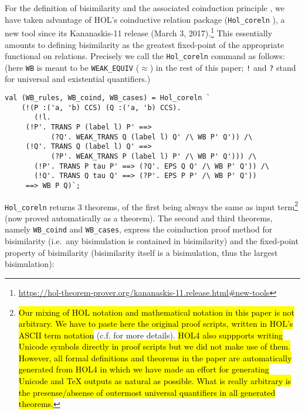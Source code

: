 For the definition of bisimilarity and the associated coinduction
principle \cite{sangiorgi2011advanced}, we have taken
advantage of HOL's coinductive relation package (\texttt{Hol_coreln} \cite{holdesc}),
a new tool since its Kananaskis-11 release (March 3,
2017).\footnote{\url{https://hol-theorem-prover.org/kananaskis-11.release.html\#new-tools}}
This essentially amounts to defining bisimilarity as the greatest
fixed-point of the appropriate functional on relations. 
Precisely we call 
the \texttt{Hol_coreln}
command as follows: (here \texttt{WB} is meant to be
\texttt{WEAK_EQUIV} ($\approx$) in the rest of this paper;
{\tt !} and {\tt ?} stand for universal and
existential quantifiers.)
\begin{lstlisting}
val (WB_rules, WB_coind, WB_cases) = Hol_coreln `
    (!(P :('a, 'b) CCS) (Q :('a, 'b) CCS).
       (!l.
	 (!P'. TRANS P (label l) P' ==>
	       (?Q'. WEAK_TRANS Q (label l) Q' /\ WB P' Q')) /\
	 (!Q'. TRANS Q (label l) Q' ==>
	       (?P'. WEAK_TRANS P (label l) P' /\ WB P' Q'))) /\
       (!P'. TRANS P tau P' ==> (?Q'. EPS Q Q' /\ WB P' Q')) /\
       (!Q'. TRANS Q tau Q' ==> (?P'. EPS P P' /\ WB P' Q'))
     ==> WB P Q)`;
\end{lstlisting}
\texttt{Hol_coreln} returns 3 theorems, of the first being always the
same as input term\footnote{\hl{Our mixing of HOL notation and mathematical
  notation in this paper is not arbitrary. We have to paste here the
  original proof scripts,  written in HOL's ASCII term
  notation} (c.f. \cite{holdesc} for more details). \hl{HOL4 also suppports writing Unicode symbols directly in
  proof scripts but we did not make use of them. 
However, all formal definitions and
  theorems in the paper are automatically generated from HOL4 in
  which we have made an effort  for generating
  Unicode and TeX outputs as natural as possible. What is really
  arbitrary is the presense/absense of outermost universal
  quantifiers in all generated theorems.}} (now proved automatically as a theorem).
The second and third theorems, namely \texttt{WB_coind} and \texttt{WB_cases},
express the coinduction proof method for bisimilarity 
(i.e.~any bisimulation is contained in bisimilarity)
and the fixed-point property of bisimilarity
(bisimilarity itself is a bisimulation, thus the largest
bisimulation):
